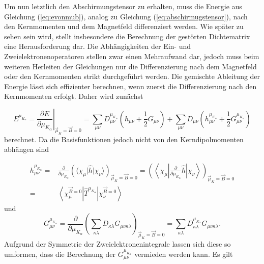   	Um nun letztlich den Abschirmungstensor zu erhalten, muss die Energie aus Gleichung (\ref{eq:evonmub}), analog zu Gleichung (\ref{eq:abschirmugstensor}), nach den Kernmomenten und dem Magnetfeld differenziert werden. Wie später zu sehen sein wird, stellt insbesondere die Berechnung der gestörten Dichtematrix eine Herausforderung dar. Die Abhängigkeiten der Ein- und Zweielektronenoperatoren stellen zwar einen Mehraufwand dar, jedoch muss beim weiteren Herleiten der Gleichungen nur die Differenzierung nach dem Magnetfeld oder den Kernmomenten strikt durchgeführt werden. 
  	Die gemischte Ableitung der Energie lässt sich effizienter berechnen, wenn zuerst die Differenzierung nach den Kernmomenten erfolgt\supercite{baron1991}. Daher wird zunächst
  	
  	\begin{equation}\label{eq:enachmu}
  	  E^{\mu_{K_\alpha}}=\left.\frac{\partial E}{\partial\mu_{K_\alpha}}\right|_{\vec{\mu}_K=\vec{B}=0}=\sum_{\mu\nu}D_{\mu\nu}^{\mu_{K_\alpha}}\left(h_{\mu\nu}+\frac{1}{2}G_{\mu\nu}\right)+\sum_{\mu\nu}D_{\mu\nu}\left(h_{\mu\nu}^{\mu_{K_\alpha}}+\frac{1}{2}G_{\mu\nu}^{\mu_{K_\alpha}}\right)
  	\end{equation}
     berechnet. Da die Basisfunktionen jedoch nicht von den Kerndipolmomenten abhängen sind  
     
     \begin{equation}\label{eq:hmukelemente}
     \begin{aligned}
       h_{\mu\nu}^{\mu_{K_\alpha}}=&\frac{\partial}{\partial \mu_{K_\alpha}}\left(\langle\chi_\mu\vert\hat{h}\vert\chi_\nu\rangle\right)_{\vec{\mu}_K=\vec{B}=0}=\left(\left\langle\chi_\mu\left\vert\frac{\partial}{\partial \mu_{K_\alpha}}\hat{h}\right\vert\chi_\nu\right\rangle\right)_{\vec{\mu}_K=\vec{B}=0}\\
       =&\left\langle\chi_\mu^{\vec{B}=0}\left\vert\hat{T}^{\mu_{K_\alpha}}\right\vert\chi_\nu^{\vec{B}=0}\right\rangle
     \end{aligned}
     \end{equation}
     und 
     \begin{equation}
      G_{\mu\nu}^{\mu_{K_\alpha}}= \frac{\partial}{\partial\mu_{K_\alpha}} \left(\sum_{\kappa\lambda}D_{\kappa\lambda}G_{\mu\nu\kappa\lambda}\right)_{\vec{\mu}_K=\vec{B}=0}=\sum_{\kappa\lambda}D_{\kappa\lambda}^{\mu_{K_\alpha}}G_{\mu\nu\kappa\lambda}.
     \end{equation}
     Aufgrund der Symmetrie der Zweielektronenintegrale lassen sich diese so umformen, dass die Berechnung der $G_{\mu\nu}^{\mu_{K_\alpha}}$ vermieden werden kann. Es gilt
     

